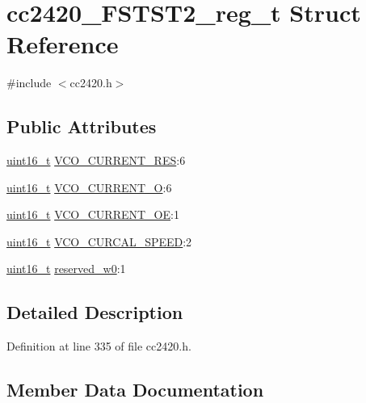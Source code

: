 \hypertarget{structcc2420___f_s_t_s_t2__reg__t}{}\section{cc2420\+\_\+\+F\+S\+T\+S\+T2\+\_\+reg\+\_\+t Struct Reference}
\label{structcc2420___f_s_t_s_t2__reg__t}


{\ttfamily \#include $<$cc2420.\+h$>$}

\subsection*{Public Attributes}
\begin{DoxyCompactItemize}
\item 
\hyperlink{_p_e___types_8h_a1f1825b69244eb3ad2c7165ddc99c956}{uint16\+\_\+t} \hyperlink{structcc2420___f_s_t_s_t2__reg__t_a726263a3e4480b6f99a3354d36ffa569}{V\+C\+O\+\_\+\+C\+U\+R\+R\+E\+N\+T\+\_\+\+R\+ES}\+:6
\item 
\hyperlink{_p_e___types_8h_a1f1825b69244eb3ad2c7165ddc99c956}{uint16\+\_\+t} \hyperlink{structcc2420___f_s_t_s_t2__reg__t_a6bcd5bb3583c782f5de9374309610cbc}{V\+C\+O\+\_\+\+C\+U\+R\+R\+E\+N\+T\+\_\+O}\+:6
\item 
\hyperlink{_p_e___types_8h_a1f1825b69244eb3ad2c7165ddc99c956}{uint16\+\_\+t} \hyperlink{structcc2420___f_s_t_s_t2__reg__t_a0656f01580fd851e8b000184369ff6b3}{V\+C\+O\+\_\+\+C\+U\+R\+R\+E\+N\+T\+\_\+\+OE}\+:1
\item 
\hyperlink{_p_e___types_8h_a1f1825b69244eb3ad2c7165ddc99c956}{uint16\+\_\+t} \hyperlink{structcc2420___f_s_t_s_t2__reg__t_a780bc8bdf7b9d04f57eb1aebc17cfccc}{V\+C\+O\+\_\+\+C\+U\+R\+C\+A\+L\+\_\+\+S\+P\+E\+ED}\+:2
\item 
\hyperlink{_p_e___types_8h_a1f1825b69244eb3ad2c7165ddc99c956}{uint16\+\_\+t} \hyperlink{structcc2420___f_s_t_s_t2__reg__t_aa7c3d845016926bb484ce1ec82fb2606}{reserved\+\_\+w0}\+:1
\end{DoxyCompactItemize}


\subsection{Detailed Description}


Definition at line 335 of file cc2420.\+h.



\subsection{Member Data Documentation}
